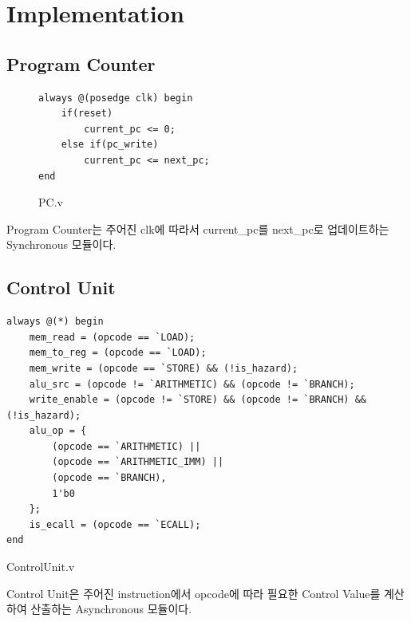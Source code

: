 \documentclass[openright, a4paper]{article}
\newenvironment{longlisting}{\captionsetup{type=listing}}{}
\begin{document}

\section{Implementation}

\subsection{Program Counter}

\begin{figure}[h]
\begin{longlisting}
    \begin{verbatim}
always @(posedge clk) begin
    if(reset) 
        current_pc <= 0;
    else if(pc_write)
        current_pc <= next_pc;
end
    \end{verbatim}    
    \caption{PC.v}
\end{longlisting}
\end{figure}

Program Counter는 주어진 clk에 따라서 current_pc를 next_pc로 업데이트하는 Synchronous 모듈이다. \\

\subsection{Control Unit}

\begin{longlisting}
    \begin{verbatim}
always @(*) begin
    mem_read = (opcode == `LOAD);
    mem_to_reg = (opcode == `LOAD);
    mem_write = (opcode == `STORE) && (!is_hazard);
    alu_src = (opcode != `ARITHMETIC) && (opcode != `BRANCH);
    write_enable = (opcode != `STORE) && (opcode != `BRANCH) && (!is_hazard);
    alu_op = {
        (opcode == `ARITHMETIC) || 
        (opcode == `ARITHMETIC_IMM) || 
        (opcode == `BRANCH),
        1'b0
    };
    is_ecall = (opcode == `ECALL);
end
    \end{verbatim}
    \caption{ControlUnit.v}
\end{longlisting}

Control Unit은 주어진 instruction에서 opcode에 따라 필요한 Control Value를 계산하여 산출하는 Asynchronous 모듈이다. \\
\end{document}

